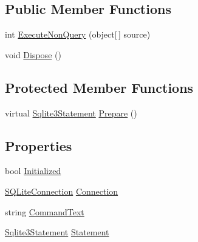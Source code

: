 \subsection*{Public Member Functions}
\begin{DoxyCompactItemize}
\item 
int \hyperlink{class_s_q_lite_1_1_prepared_sql_lite_insert_command_a9f95629a1b978710741c23129d78fccc}{Execute\+Non\+Query} (object\mbox{[}$\,$\mbox{]} source)
\item 
void \hyperlink{class_s_q_lite_1_1_prepared_sql_lite_insert_command_a4569b8fb13658e105658b073937efead}{Dispose} ()
\end{DoxyCompactItemize}
\subsection*{Protected Member Functions}
\begin{DoxyCompactItemize}
\item 
virtual \hyperlink{_s_q_lite_8cs_ab557efa2a7318f6132dd96d8ee66bf7c}{Sqlite3\+Statement} \hyperlink{class_s_q_lite_1_1_prepared_sql_lite_insert_command_a207353ff88c74bc45cb076fe3cf463bb}{Prepare} ()
\end{DoxyCompactItemize}
\subsection*{Properties}
\begin{DoxyCompactItemize}
\item 
bool \hyperlink{class_s_q_lite_1_1_prepared_sql_lite_insert_command_a9bc93418687042e4ee5b0fde8291b388}{Initialized}
\item 
\hyperlink{class_s_q_lite_1_1_s_q_lite_connection}{S\+Q\+Lite\+Connection} \hyperlink{class_s_q_lite_1_1_prepared_sql_lite_insert_command_aef54b0acba4b83045e5e5fa17286bb27}{Connection}
\item 
string \hyperlink{class_s_q_lite_1_1_prepared_sql_lite_insert_command_a435ce4bcdc122f2f5b6b96a7d89b3a29}{Command\+Text}
\item 
\hyperlink{_s_q_lite_8cs_ab557efa2a7318f6132dd96d8ee66bf7c}{Sqlite3\+Statement} \hyperlink{class_s_q_lite_1_1_prepared_sql_lite_insert_command_a5b8cfa2ccca99c02f38538be5d089c2d}{Statement}
\end{DoxyCompactItemize}


